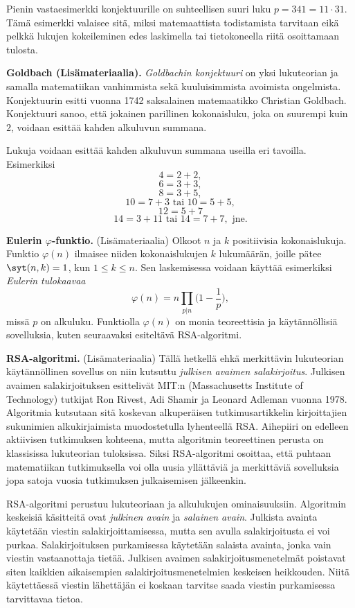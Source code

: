 Pienin vastaesimerkki konjektuurille on suhteellisen suuri luku $p=341 = 11\cdot 31$. Tämä esimerkki valaisee sitä, miksi matemaattista todistamista tarvitaan eikä pelkkä lukujen kokeileminen edes laskimella tai tietokoneella riitä osoittamaan tulosta.


{\bf Goldbach (Lisämateriaalia).}
{\em Goldbachin konjektuuri} on yksi lukuteorian ja samalla matematiikan vanhimmista sekä kuuluisimmista avoimista ongelmista. Konjektuurin esitti vuonna 1742 saksalainen mate\-maa\-tik\-ko Christian Goldbach. Konjektuuri sanoo, että jokainen parillinen kokonaisluku, joka on suurempi kuin $2$, voidaan esittää kahden alkuluvun summana. 

Lukuja voidaan esittää kahden alkuluvun summana useilla eri tavoilla. Esimerkiksi
\[
  4 = 2 + 2,
\]
\[
  6 = 3 + 3,
\]
\[
  8 = 3 + 5,
\]
\[
10 = 7 + 3\textrm{ tai } 10=5 + 5,
\]
\[
12 = 5 + 7
\]
\[
14 = 3 + 11\textrm{ tai }14 =7 + 7, \textrm{ jne.}
\]

{\bf Eulerin $\varphi$-funktio.} (Lisämateriaalia)
Olkoot $n$ ja $k$ positiivisia kokonaislukuja. Funktio $\varphi(n)$ ilmaisee niiden kokonaislukujen $k$ lukumäärän, joille pätee 
$\syt(n, k) = 1$, kun $1\le k \le n$. Sen laskemisessa voidaan käyttää esimerkiksi {\em Eulerin tulokaavaa}
\[
\varphi(n)=n \prod_{p|n} \bigg(1-\frac{1}{p}\bigg),
\]
missä $p$ on alkuluku. Funktiolla $\varphi(n)$ on monia teoreettisia ja käy\-tän\-nöl\-li\-siä sovelluksia, kuten seuraavaksi esiteltävä RSA-algoritmi.

{\bf RSA-algoritmi.} (Lisämateriaalia) Tällä hetkellä ehkä merkittävin lukuteorian käy\-tän\-nöl\-li\-nen sovellus on niin kutsuttu {\em julkisen avaimen salakirjoitus}. Julkisen avaimen salakirjoituksen esittelivät MIT:n (Massachusetts Institute of Technology) tutkijat Ron Rivest, Adi Shamir ja Leonard Adleman vuonna 1978. Algoritmia kutsutaan sitä koskevan alkuperäisen tutkimusartikkelin kirjoittajien sukunimien alkukirjaimista muodostetulla lyhenteellä RSA. Aihepiiri on edelleen aktiivisen tutkimuksen kohteena, mutta algoritmin teoreettinen perusta on klassisissa lukuteorian tuloksissa. Siksi RSA-algoritmi osoittaa, että puhtaan matematiikan tutkimuksella voi olla uusia yllättäviä ja merkittäviä sovelluksia jopa satoja vuosia tutkimuksen julkaisemisen jälkeenkin.

RSA-algoritmi perustuu lukuteoriaan ja alkulukujen ominaisuuksiin. Algoritmin keskeisiä käsitteitä ovat {\em julkinen avain} ja {\em salainen avain}. Julkista avainta käytetään viestin salakirjoittamisessa, mutta sen avulla salakirjoitusta ei voi purkaa. Salakirjoituksen purkamisessa käytetään salaista avainta, jonka vain viestin vastaanottaja tietää. Julkisen avaimen salakirjoitusmenetelmät poistavat siten kaikkien aikaisempien salakirjoitusmenetelmien keskeisen heikkouden. Niitä käytettäessä viestin lähettäjän ei koskaan tarvitse saada viestin purkamisessa tarvittavaa tietoa. 

